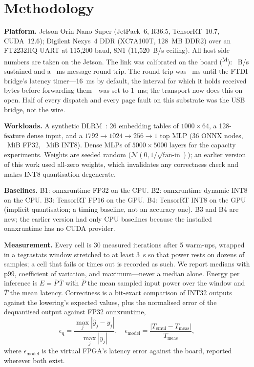 \documentclass[lettersize,journal]{IEEEtran}
\newcommand{\M}{\textsuperscript{M}}
\begin{document}
\section{Methodology}
\label{sec:method}

\textbf{Platform.} Jetson Orin Nano Super (JetPack~6, R36.5, TensorRT~10.7, CUDA~12.6); Digilent Nexys~4 DDR (XC7A100T, 128~MB DDR2) over an FT2232HQ UART at 115{,}200 baud, 8N1 (11{,}520~B/s ceiling). All host-side numbers are taken on the Jetson. The link was calibrated on the board (\M): \MLinkBw~B/s sustained and a \MLinkRtt~ms message round trip. The round trip was \MLinkRttDefaultTimer~ms until the FTDI bridge's latency timer---16~ms by default, the interval for which it holds received bytes before forwarding them---was set to 1~ms; the transport now does this on open. Half of every dispatch and every page fault on this substrate was the USB bridge, not the wire.

\textbf{Workloads.} A synthetic DLRM~\cite{dlrm}: 26 embedding tables of $1000{\times}64$, a 128-feature dense input, and a $1792{\to}1024{\to}256{\to}1$ top MLP (36 ONNX nodes, \CDlrmWeightsMiB~MiB FP32, \PDlrmImageMiB~MiB INT8). Dense MLPs of $5000{\times}5000$ layers for the capacity experiments. Weights are seeded random ($\mathcal{N}(0,1/\sqrt{\text{fan-in}})$); an earlier version of this work used all-zero weights, which invalidates any correctness check and makes INT8 quantisation degenerate.

\textbf{Baselines.} B1: onnxruntime FP32 on the CPU. B2: onnxruntime dynamic INT8 on the CPU. B3: TensorRT FP16 on the GPU. B4: TensorRT INT8 on the GPU (implicit quantisation; a timing baseline, not an accuracy one). B3 and B4 are new; the earlier version had only CPU baselines because the installed onnxruntime has no CUDA provider.

\textbf{Measurement.} Every cell is 30 measured iterations after 5 warm-ups, wrapped in a tegrastats window stretched to at least 3~s so that power rests on dozens of samples; a cell that fails or times out is recorded as such. We report medians with p99, coefficient of variation, and maximum---never a median alone. Energy per inference is $E = \bar{P}\,\bar{T}$ with $\bar{P}$ the mean sampled input power over the window and $\bar{T}$ the mean latency. Correctness is a bit-exact comparison of INT32 outputs against the lowering's expected values, plus the normalised error of the dequantised output against FP32 onnxruntime,
\begin{equation}
\epsilon_{\text{q}} = \frac{\max_j |\hat{y}_j - y_j|}{\max_j |y_j|}, \quad
\epsilon_{\text{model}} = \frac{|T_{\text{emul}} - T_{\text{meas}}|}{T_{\text{meas}}},
\label{eq:errors}
\end{equation}
where $\epsilon_{\text{model}}$ is the virtual FPGA's latency error against the board, reported wherever both exist.
\end{document}
